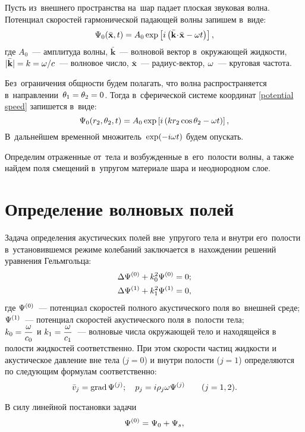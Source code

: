 Пусть из~внешнего пространства на~шар падает плоская звуковая волна. Потенциал скоростей гармонической падающей волны запишем в~виде:
\begin{equation}\label{potential speed}
\P_0(\bar{\mathbf{x}}, t) = A_0 \exp\left[i\left(\bar{\mathbf{k}}\dotm\bar{\mathbf{x}}-\om t\right)\right],
\end{equation}
где $A_0$~--- амплитуда волны, $\bar{\mathbf{k}}$~--- волновой вектор в~окружающей жидкости,  $\lvert\bar{\mathbf{k}}\rvert = k = \om / c$~--- волновое число, $\bar{\mathbf{x}}$~--- радиус-вектор, $\om$~--- круговая частота.

 Без~ограничения общности будем полагать, что волна распространяется в~направлении~$\Q_1 = \Q_2 = 0$. Тогда в~сферической системе координат \eqref{potential speed} запишется в~виде:
\begin{equation}
\P_0(r_2, \Q_2, t) = A_0 \exp\left[i\left(kr_2\cos\Q_2 - \om t\right)\right],
\end{equation}
В~дальнейшем временной множитель~$\exp(-i\om t)$ будем опускать.

Определим отраженные от~тела и возбужденные в~его~полости волны, а также найдем поля смещений в~упругом материале шара и неоднородном слое.

\section{Определение волновых полей}
Задача определения акустических полей вне~упругого тела и внутри его~полости в~установившемся режиме колебаний заключается в~нахождении решений уравнения Гельмгольца:
\begin{align}
\Lap\P^{(0)} &+ k_0^2\P^{(0)} = 0;\label{Helmholtz_ambient}\\
\Lap\P^{(1)} &+ k_1^2\P^{(1)} = 0,\label{Helmholtz_hollow}
\end{align}
где $\P^{(0)}$~--- потенциал скоростей полного акустического поля во~внешней среде;\\
$\P^{(1)}$~--- потенциал скоростей акустического поля в~полости тела;\\
$k_0 = \df{\om}{c_0}$ и $k_1 = \df{\om}{c_1}$~--- волновые числа окружающей тело и находящейся в полости жидкостей соответственно. При этом скорости частиц жидкости и акустическое давление вне тела ($j = 0$) и внутри полости ($j = 1$) определяются по следующим формулам соответственно:
\begin{equation}
\bar{v}_j = \grad\P^{(j)}; \q p_j = i\r_j\om\P^{(j)} \qq (j = 1, 2).
\end{equation}


В силу линейной постановки задачи 
\begin{equation}
\P^{(0)} = \P_0 + \P_s,
\end{equation}
